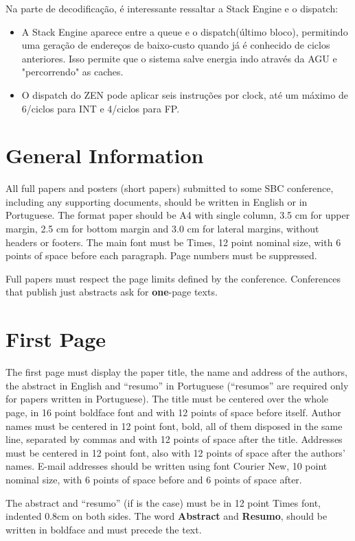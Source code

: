 \documentclass[12pt]{article}
\begin{document}
Na parte de decodificação, é interessante ressaltar a Stack Engine e o dispatch:
\begin{itemize}
	\item A Stack Engine aparece entre a queue e o dispatch(último bloco), permitindo uma geração de endereços de baixo-custo quando já é conhecido de ciclos anteriores. Isso permite que o sistema salve energia indo através da AGU e "percorrendo" as caches.
	\item O dispatch do ZEN pode aplicar seis instruções por clock, até um máximo de 6/ciclos para INT e 4/ciclos para FP.
\end{itemize}

\section{General Information}

All full papers and posters (short papers) submitted to some SBC conference,
including any supporting documents, should be written in English or in
Portuguese. The format paper should be A4 with single column, 3.5 cm for upper
margin, 2.5 cm for bottom margin and 3.0 cm for lateral margins, without
headers or footers. The main font must be Times, 12 point nominal size, with 6
points of space before each paragraph. Page numbers must be suppressed.

Full papers must respect the page limits defined by the conference.
Conferences that publish just abstracts ask for \textbf{one}-page texts.

\section{First Page} \label{sec:firstpage}

The first page must display the paper title, the name and address of the
authors, the abstract in English and ``resumo'' in Portuguese (``resumos'' are
required only for papers written in Portuguese). The title must be centered
over the whole page, in 16 point boldface font and with 12 points of space
before itself. Author names must be centered in 12 point font, bold, all of
them disposed in the same line, separated by commas and with 12 points of
space after the title. Addresses must be centered in 12 point font, also with
12 points of space after the authors' names. E-mail addresses should be
written using font Courier New, 10 point nominal size, with 6 points of space
before and 6 points of space after.

The abstract and ``resumo'' (if is the case) must be in 12 point Times font,
indented 0.8cm on both sides. The word \textbf{Abstract} and \textbf{Resumo},
should be written in boldface and must precede the text.
\end{document}
